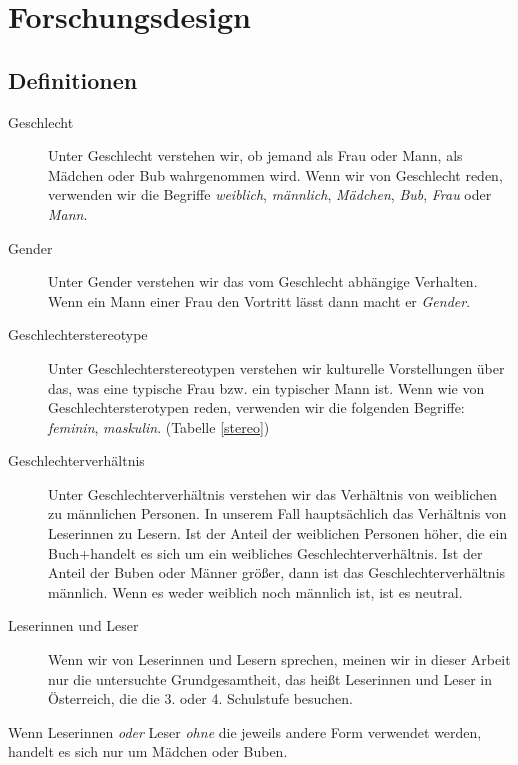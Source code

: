 \chapter{Forschungsdesign}

\section{Definitionen}

\begin{description}
\item[Geschlecht]
Unter Geschlecht verstehen wir, ob jemand als Frau oder Mann, als
Mädchen oder Bub wahrgenommen wird. Wenn wir von Geschlecht reden,
verwenden wir die Begriffe \emph{weiblich}, \emph{männlich},
\emph{Mädchen}, \emph{Bub}, \emph{Frau} oder \emph{Mann}.
\item[Gender]
Unter Gender verstehen wir das vom Geschlecht abhängige Verhalten. Wenn
ein Mann einer Frau den Vortritt lässt dann macht er \emph{Gender}.
\item[Geschlechterstereotype]
Unter Geschlechterstereotypen verstehen wir kulturelle Vorstellungen
über das, was eine typische Frau bzw. ein typischer Mann ist. Wenn wie
von Geschlechtersterotypen reden, verwenden wir die folgenden Begriffe:
\emph{feminin}, \emph{maskulin}. (Tabelle \ref{stereo})
\end{description}



\begin{description}
\item[Geschlechterverhältnis]
Unter Geschlechterverhältnis verstehen wir das Verhältnis von weiblichen
zu männlichen Personen. In unserem Fall hauptsächlich das Verhältnis von
Leserinnen zu Lesern. Ist der Anteil der weiblichen Personen höher, die
ein Buch+handelt es sich um ein weibliches Geschlechterverhältnis. Ist
der Anteil der Buben oder Männer größer, dann ist das
Geschlechterverhältnis männlich. Wenn es weder weiblich noch männlich
ist, ist es neutral.
\item[Leserinnen und Leser]
Wenn wir von Leserinnen und Lesern sprechen, meinen wir in dieser Arbeit
nur die untersuchte Grundgesamtheit, das heißt Leserinnen und Leser in
Österreich, die die 3. oder 4. Schulstufe besuchen.
\end{description}

Wenn Leserinnen \emph{oder} Leser \emph{ohne} die jeweils andere Form
verwendet werden, handelt es sich nur um Mädchen oder Buben.

